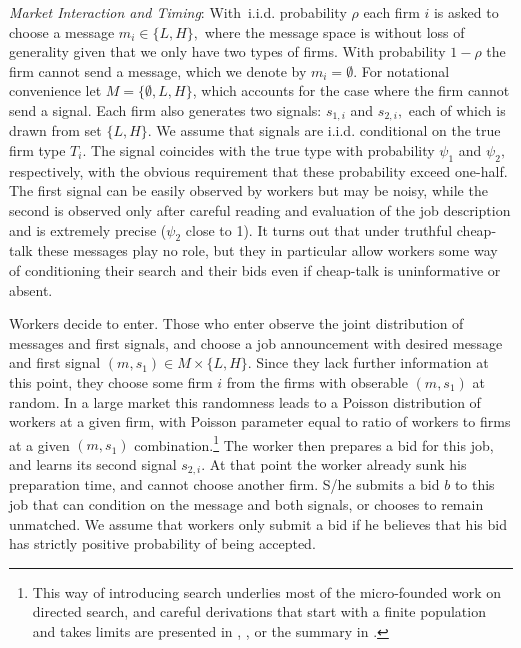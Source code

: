 \documentclass[12pt]{article}
\theoremstyle{plain}
\begin{document}

\textit{Market Interaction and Timing}: With\ i.i.d. probability $\rho $
each firm $i$ is asked to choose a message $m_{i}\in \{L,H\},$ where the
message space is without loss of generality given that we only have two
types of firms. With probability $1-\rho $ the firm cannot send a message,
which we denote by $m_{i}=\emptyset .$ For notational convenience let $%
M=\{\emptyset ,L,H\}$, which accounts for the case where the firm cannot
send a signal. Each firm also generates two signals: $s_{1,i}$ and $s_{2,i},$
each of which is drawn from set $\{L,H\}.$ We assume that signals are i.i.d.
conditional on the true firm type $T_{i}.$ The signal coincides with the
true type with probability $\psi _{1}$ and $\psi _{2},$ respectively, with
the obvious requirement that these probability exceed one-half. The first
signal can be easily observed by workers but may be noisy, while the second
is observed only after careful reading and evaluation of the job description
and is extremely precise ($\psi _{2}$ close to 1). It turns out that under
truthful cheap-talk these messages play no role, but they in particular
allow workers some way of conditioning their search and their bids even if
cheap-talk is uninformative or absent.

Workers decide to enter. Those who enter observe the joint distribution of
messages and first signals, and choose a job announcement with desired
message and first signal $(m,s_{1})\in M\times \{L,H\}$. Since they lack
further information at this point, they choose some firm $i$ from the firms
with obserable $(m,s_{1})$ at random. In a large market this randomness
leads to a Poisson distribution of workers at a given firm, with Poisson
parameter equal to ratio of workers to firms at a given $(m,s_{1})$
combination.\footnote{%
This way of introducing search underlies most of the micro-founded work on
directed search, and careful derivations that start with a finite population
and takes limits are presented in \cite{peters_1991}, \cite{peters_1997}, \cite{burdett_etal2001} or the summary in \cite{wright_etal2021}.} The worker then prepares a bid for
this job, and learns its second signal $s_{2,i}.$ At that point the worker
already sunk his preparation time, and cannot choose another firm. S/he
submits a bid $b$ to this job that can condition on the message and both
signals, or chooses to remain unmatched. We assume that workers only submit
a bid if he believes that his bid has strictly positive probability of being
accepted.
\end{document}
